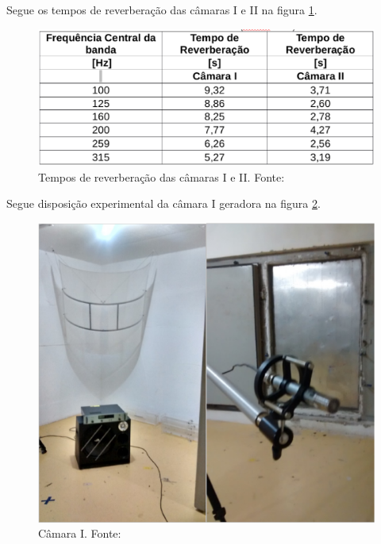 Segue os tempos de reverberação das câmaras I e II na figura \ref{experimento_3}.
\begin{figure}[h]
	\centering
	\includegraphics[scale=0.35]{imagem_5.eps}
	\caption{Tempos de reverberação das câmaras I e II. Fonte: \cite{silva2009simulaccao}}
	\label{experimento_3}
\end{figure}

\newpage
Segue disposição experimental da câmara I geradora na figura \ref{experimento_4}.
\begin{figure}[h]
	\centering
	\includegraphics[scale=0.35]{imagem_2.eps}
	\caption{Câmara I. Fonte: \cite{silva2009simulaccao}}
	\label{experimento_4}
\end{figure}

